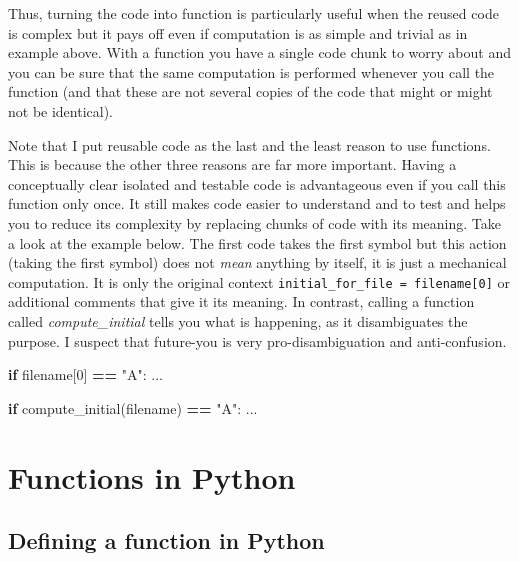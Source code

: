 \documentclass[
]{book}
\newenvironment{Shaded}{\begin{snugshade}}{\end{snugshade}}
\newcommand{\ControlFlowTok}[1]{\textcolor[rgb]{0.13,0.29,0.53}{\textbf{#1}}}
\newcommand{\DecValTok}[1]{\textcolor[rgb]{0.00,0.00,0.81}{#1}}
\newcommand{\NormalTok}[1]{#1}
\newcommand{\OperatorTok}[1]{\textcolor[rgb]{0.81,0.36,0.00}{\textbf{#1}}}
\newcommand{\StringTok}[1]{\textcolor[rgb]{0.31,0.60,0.02}{#1}}
\begin{document}
Thus, turning the code into function is particularly useful when the reused code is complex but it pays off even if computation is as simple and trivial as in example above. With a function you have a single code chunk to worry about and you can be sure that the same computation is performed whenever you call the function (and that these are not several copies of the code that might or might not be identical).

Note that I put reusable code as the last and the least reason to use functions. This is because the other three reasons are far more important. Having a conceptually clear isolated and testable code is advantageous even if you call this function only once. It still makes code easier to understand and to test and helps you to reduce its complexity by replacing chunks of code with its meaning. Take a look at the example below. The first code takes the first symbol but this action (taking the first symbol) does not \emph{mean} anything by itself, it is just a mechanical computation. It is only the original context \texttt{initial\_for\_file\ =\ filename{[}0{]}} or additional comments that give it its meaning. In contrast, calling a function called \emph{compute\_initial} tells you what is happening, as it disambiguates the purpose. I suspect that future-you is very pro-disambiguation and anti-confusion.

\begin{Shaded}
\begin{Highlighting}[]
\ControlFlowTok{if}\NormalTok{ filename[}\DecValTok{0}\NormalTok{] }\OperatorTok{==} \StringTok{"A"}\NormalTok{:}
\NormalTok{    ...}
    
\ControlFlowTok{if}\NormalTok{ compute\_initial(filename) }\OperatorTok{==} \StringTok{"A"}\NormalTok{:}
\NormalTok{    ...}
\end{Highlighting}
\end{Shaded}

\hypertarget{functions-in-python}{%
\section{Functions in Python}\label{functions-in-python}}

\hypertarget{defining-a-function-in-python}{%
\subsection{Defining a function in Python}\label{defining-a-function-in-python}}
\end{document}
